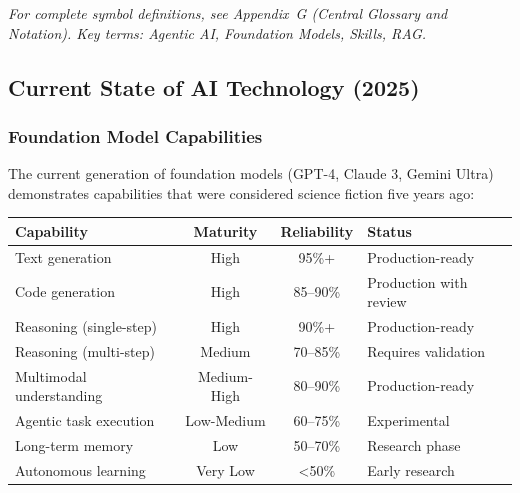 
\noindent\textit{For complete symbol definitions, see Appendix~G (Central Glossary
and Notation). Key terms: Agentic AI, Foundation Models, Skills, RAG.}


\subsection{Current State of AI Technology (2025)}

\subsubsection{Foundation Model Capabilities}

The current generation of foundation models (GPT-4, Claude 3, Gemini Ultra)
demonstrates capabilities that were considered science fiction five years ago:


\begin{tcolorbox}[colback=orange!5!white, colframe=orange!75!black,
    title=\textbf{Key Results: Capability Maturity 2025}]

\begin{tabular}{@{}p{4cm}ccp{4cm}@{}}
\textbf{Capability} & \textbf{Maturity} & \textbf{Reliability} & \textbf{Status} \\
\hline
Text generation & High & 95\%+ & Production-ready \\
Code generation & High & 85--90\% & Production with review \\
Reasoning (single-step) & High & 90\%+ & Production-ready \\
Reasoning (multi-step) & Medium & 70--85\% & Requires validation \\
Multimodal understanding & Medium-High & 80--90\% & Production-ready \\
Agentic task execution & Low-Medium & 60--75\% & Experimental \\
Long-term memory & Low & 50--70\% & Research phase \\
Autonomous learning & Very Low & <50\% & Early research \\
\end{tabular}

\end{tcolorbox}

